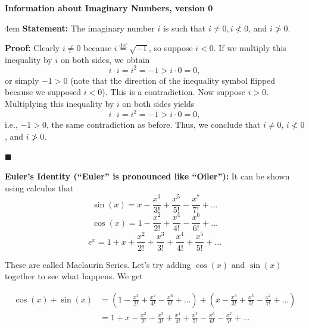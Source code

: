 \documentclass[12pt]{article}
\begin{document}

\begin{center}
\begin{Large}
\textbf{Information about Imaginary Numbers, version 0} \\

\vspace{5mm}
\end{Large}
\end{center}

\vspace{10mm}

\begin{addmargin}[3em]{4em}
\textbf{Statement:} \hspace{2mm} The imaginary number $i$ is such that $i\neq0, i \not< 0$, and $i\not>0$.

\vspace{5mm}

\noindent\textbf{Proof:} Clearly $i\neq 0$ because $i\overset{\text{def}}{=}\sqrt{-1}$, so suppose $i<0$. If we multiply this inequality by $i$ on both sides, we obtain $$i\cdot i = i^2 = -1 > i \cdot 0 = 0,$$ or simply $-1 > 0$ (note that the direction of the inequality symbol flipped because we supposed $i<0$). This is a contradiction. Now suppose $i>0$. Multiplying this inequality by $i$ on both sides yields $$i\cdot i = i^2 = -1 > i\cdot 0 = 0,$$ i.e., $-1>0$, the same contradiction as before. Thus, we conclude that $i\neq 0$, $i\not<0$, and $i\not>0.$

\hfill$\blacksquare$

\vspace{80mm}

\noindent\textbf{Euler's Identity (``Euler'' is pronounced like ``Oiler''):} It can be shown using calculus that $$\sin(x) = x - \frac{x^3}{3!} + \frac{x^5}{5!} - \frac{x^7}{7!} + \ldots$$ $$\cos(x) = 1 - \frac{x^2}{2!} + \frac{x^4}{4!} - \frac{x^6}{6!} + \ldots$$ $$e^x = 1 + x + \frac{x^2}{2!} + \frac{x^3}{3!} + \frac{x^4}{4!} + \frac{x^5}{5!} + \ldots$$ 

\vspace{2mm}

\noindent These are called Maclaurin Series. Let's try adding $\cos(x)$ and $\sin(x)$ together to see what happens. We get

\begin{align*}
\cos(x) + \sin(x) &= \left(1 - \frac{x^2}{2!} + \frac{x^4}{4!} - \frac{x^6}{6!} + \ldots\right) + \left( x - \frac{x^3}{3!} + \frac{x^5}{5!} - \frac{x^7}{7!} + \ldots\right) \\
&= 1 + x - \frac{x^2}{2!} - \frac{x^3}{3!} + \frac{x^4}{4!} + \frac{x^5}{5!} - \frac{x^6}{6!} - \frac{x^7}{7!} + \ldots
\end{align*}


\end{addmargin}
\end{document}
